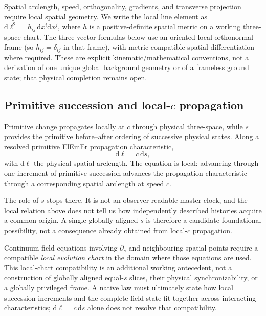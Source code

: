 \documentclass[11pt]{article}
\theoremstyle{definition}
\newcommand{\ElEmEr}{\mbox{ElEmEr}}
\newcommand{\dd}{\mathrm{d}}
\begin{document}
Spatial arclength, speed, orthogonality, gradients, and transverse projection require
local spatial geometry.  We write the local line element as
$\dd\ell^2=h_{ij}\,\dd x^i\dd x^j$, where $h$ is a positive-definite
spatial metric on a working three-space chart.  The three-vector formulas below use
an oriented local orthonormal frame (so $h_{ij}=\delta_{ij}$ in that frame), with
metric-compatible spatial differentiation where required.  These are explicit
kinematic/mathematical conventions, not a derivation of one unique global background
geometry or of a frameless ground state; that physical completion remains open.

\subsection{Primitive succession and local-\texorpdfstring{$c$}{c} propagation}
\label{subsec:succession}

Primitive change propagates locally at $c$ through physical three-space, while $s$
provides the primitive before--after ordering of successive physical states.  Along a
resolved primitive \ElEmEr{} propagation characteristic,
\begin{equation}
  \boxed{\dd\ell=c\,\dd s,}
  \label{eq:dlds}
\end{equation}
with $\dd\ell$ the physical spatial arclength.  The equation is local: advancing through
one increment of primitive succession advances the propagation characteristic through a
corresponding spatial arclength at speed $c$.

The role of $s$ stops there.  It is not an observer-readable master clock, and the local
relation above does not tell us how independently described histories acquire a common
origin.  A single globally aligned $s$ is therefore a candidate foundational possibility,
not a consequence already obtained from local-$c$ propagation.

Continuum field equations involving $\partial_s$ and neighbouring spatial points
require a compatible \emph{local evolution chart} in the domain where those equations
are used.  This local-chart compatibility is an additional working antecedent, not a
construction of globally aligned equal-$s$ slices, their physical synchronizability,
or a globally privileged frame.  A native law must ultimately state how local succession
increments and the complete field state fit together across interacting characteristics;
$\dd\ell=c\,\dd s$ alone does not resolve that compatibility.
\end{document}
